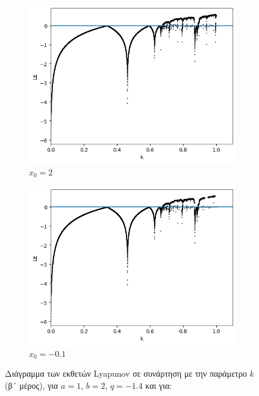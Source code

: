 \begin{figure}[h!]
	\centering
	\begin{subfigure}[b]{0.45\textwidth}
		\centering
		\includegraphics[width=\textwidth]{LateX images/graphs q16/g11}
		\caption{\(x_0=2\)}
		\label{f:g37}
	\end{subfigure}
	\hfill
	\begin{subfigure}[b]{0.45\textwidth}
		\centering
		\includegraphics[width=\textwidth]{LateX images/graphs q16/g12}
		\caption{\(x_0=-0.1\)}
		\label{f:g38}
	\end{subfigure}
	\hfill
	\caption{ Διάγραμμα των εκθετών Lyapunov σε συνάρτηση με την παράμετρο \emph{k} (β´ μέρος), για $a = 1$, $b = 2$, $q=-1.4$ και για:}
\end{figure}


